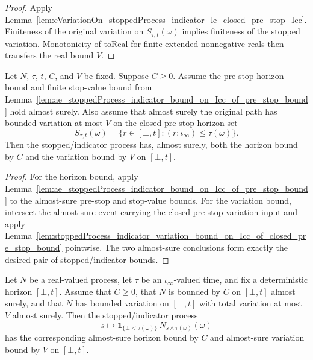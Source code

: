 \begin{proof}
Apply
Lemma~\ref{lem:eVariationOn_stoppedProcess_indicator_le_closed_pre_stop_Icc}.
Finiteness of the original variation on \(S_{\tau,t}(\omega)\) implies
finiteness of the stopped variation.  Monotonicity of
\(\mathrm{toReal}\) for finite extended nonnegative reals then transfers the
real bound \(V\).
\end{proof}

\begin{lemma}\label{lem:ae_stoppedProcess_indicator_bound_variation_on_Icc_of_pre_stop_bound}
Let \(N\), \(\tau\), \(t\), \(C\), and \(V\) be fixed.  Suppose \(C\ge0\).
Assume the pre-stop horizon bound and finite stop-value bound from
Lemma~\ref{lem:ae_stoppedProcess_indicator_bound_on_Icc_of_pre_stop_bound}
hold almost surely.  Also assume that almost surely the original path has
bounded variation at most \(V\) on the closed pre-stop horizon set
\[
  S_{\tau,t}(\omega)
  =
  \{r\in[\bot,t] : (r:\iota_\infty)\le \tau(\omega)\}.
\]
Then the stopped/indicator process has, almost surely, both the horizon bound
by \(C\) and the variation bound by \(V\) on \([\bot,t]\).
\end{lemma}

\begin{proof}
For the horizon bound, apply
Lemma~\ref{lem:ae_stoppedProcess_indicator_bound_on_Icc_of_pre_stop_bound}
to the almost-sure pre-stop and stop-value bounds.  For the variation bound,
intersect the almost-sure event carrying the closed pre-stop variation input
and apply
Lemma~\ref{lem:stoppedProcess_indicator_variation_bound_on_Icc_of_closed_pre_stop_bound}
pointwise.  The two almost-sure conclusions form exactly the desired pair of
stopped/indicator bounds.
\end{proof}

\begin{lemma}\label{lem:ae_stoppedProcess_indicator_bound_variation_on_Icc}
Let \(N\) be a real-valued process, let \(\tau\) be an
\(\iota_\infty\)-valued time, and fix a deterministic horizon \([\bot,t]\).
Assume that \(C\ge0\), that \(N\) is bounded by \(C\) on \([\bot,t]\) almost
surely, and that \(N\) has bounded variation on \([\bot,t]\) with total
variation at most \(V\) almost surely.  Then the stopped/indicator process
\[
  s\longmapsto
  \mathbf 1_{\{\bot<\tau(\omega)\}}\,
  N_{s\wedge\tau(\omega)}(\omega)
\]
has the corresponding almost-sure horizon bound by \(C\) and almost-sure
variation bound by \(V\) on \([\bot,t]\).
\end{lemma}

